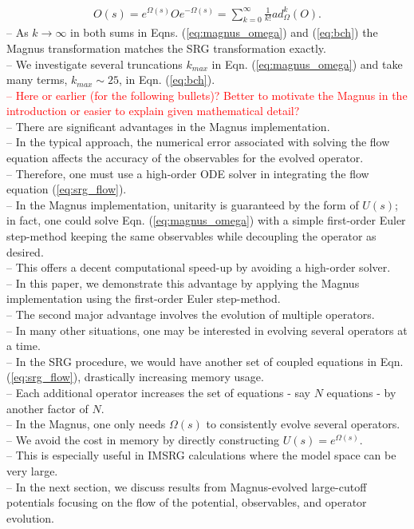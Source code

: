 \documentclass[preprintnumbers,floatfix,aps,prc,preprint,nofootinbib]{revtex4-1}
\begin{document}
%
\begin{eqnarray}
	\label{eq:bch}
	O(s) = e^{\Omega(s)} O e^{-\Omega(s)} = \sum_{k=0}^{\infty} \frac{1}{k!} ad_{\Omega}^{k}(O).
\end{eqnarray}
%
-- As $k \rightarrow \infty$ in both sums in Eqns. (\ref{eq:magnus_omega}) and (\ref{eq:bch}) the Magnus transformation matches the SRG transformation exactly.
\\
-- We investigate several truncations $k_{max}$ in Eqn. (\ref{eq:magnus_omega}) and take many terms, $k_{max} \sim 25$, in Eqn. (\ref{eq:bch}).
\\
\textcolor{red}{%
-- Here or earlier (for the following bullets)? Better to motivate the Magnus in the introduction or easier to explain given mathematical detail?
}
\\
-- There are significant advantages in the Magnus implementation.
\\
-- In the typical approach, the numerical error associated with solving the flow equation affects the accuracy of the observables for the evolved operator.
\\
-- Therefore, one must use a high-order ODE solver in integrating the flow equation (\ref{eq:srg_flow}).
\\
-- In the Magnus implementation, unitarity is guaranteed by the form of $U(s)$; in fact, one could solve Eqn. (\ref{eq:magnus_omega}) with a simple first-order Euler step-method keeping the same observables while decoupling the operator as desired.
\\
-- This offers a decent computational speed-up by avoiding a high-order solver.
\\
-- In this paper, we demonstrate this advantage by applying the Magnus implementation using the first-order Euler step-method.
\\
-- The second major advantage involves the evolution of multiple operators.
\\
-- In many other situations, one may be interested in evolving several operators at a time.
\\
-- In the SRG procedure, we would have another set of coupled equations in Eqn. (\ref{eq:srg_flow}), drastically increasing memory usage.
\\
-- Each additional operator increases the set of equations - say $N$ equations - by another factor of $N$.
\\
-- In the Magnus, one only needs $\Omega(s)$ to consistently evolve several operators.
\\
-- We avoid the cost in memory by directly constructing $U(s)=e^{\Omega(s)}$.
\\
-- This is especially useful in IMSRG calculations where the model space can be very large.
\\
-- In the next section, we discuss results from Magnus-evolved large-cutoff potentials focusing on the flow of the potential, observables, and operator evolution.
\end{document}
